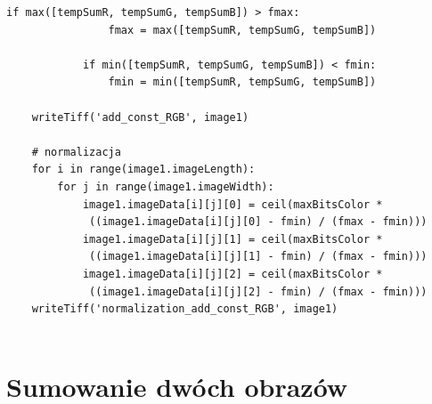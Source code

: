 \documentclass[magisterska,openany]{pracadypl}
\begin{document}
\begin{lstlisting}[caption={Sumowanie (okreslonej) stałej z obrazem RGB}]
            if max([tempSumR, tempSumG, tempSumB]) > fmax:
                fmax = max([tempSumR, tempSumG, tempSumB])

            if min([tempSumR, tempSumG, tempSumB]) < fmin:
                fmin = min([tempSumR, tempSumG, tempSumB])

    writeTiff('add_const_RGB', image1)

    # normalizacja
    for i in range(image1.imageLength):
        for j in range(image1.imageWidth):
            image1.imageData[i][j][0] = ceil(maxBitsColor *
             ((image1.imageData[i][j][0] - fmin) / (fmax - fmin)))
            image1.imageData[i][j][1] = ceil(maxBitsColor *
             ((image1.imageData[i][j][1] - fmin) / (fmax - fmin)))
            image1.imageData[i][j][2] = ceil(maxBitsColor *
             ((image1.imageData[i][j][2] - fmin) / (fmax - fmin)))
    writeTiff('normalization_add_const_RGB', image1)


\end{lstlisting}


\newpage
\section{Sumowanie dwóch obrazów}
\end{document}
